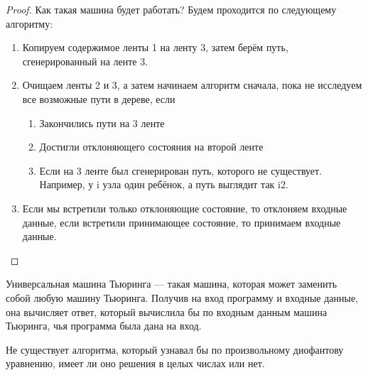 \begin{proof}
        \par Как такая машина будет работать? Будем проходится по следующему алгоритму:
        \begin{enumerate}
            \item Копируем содержимое ленты 1 на ленту 3, затем берём путь, сгенерированный на ленте 3.
            \item Очищаем ленты 2 и 3, а затем начинаем алгоритм сначала, пока не исследуем все возможные пути в дереве, если
                \begin{enumerate}
                    \item Закончились пути на 3 ленте
                    \item Достигли отклоняющего состояния на второй ленте
                    \item Если на 3 ленте был сгенерирован путь, которого не существует. Например, у i узла один ребёнок, а путь выглядит так i2.
                \end{enumerate}
            \item Если мы встретили только отклоняющие состояние, то отклоняем входные данные, если встретили принимающее состояние, то принимаем входные данные.
        \end{enumerate}
    \end{proof}

        
    
    \begin{Def} 
    Универсальная машина Тьюринга --- такая машина, которая может заменить собой любую машину Тьюринга. Получив на вход программу и входные данные, она вычисляет ответ, который вычислила бы по входным данным машина Тьюринга, чья программа была дана на вход.
    \end{Def}
    \begin{Def} 
    \end{Def}

    
    \begin{Thm}
        Не существует алгоритма, который узнавал бы по произвольному диофантову уравнению, имеет ли оно решения в целых числах или нет.
    \end{Thm}

    
